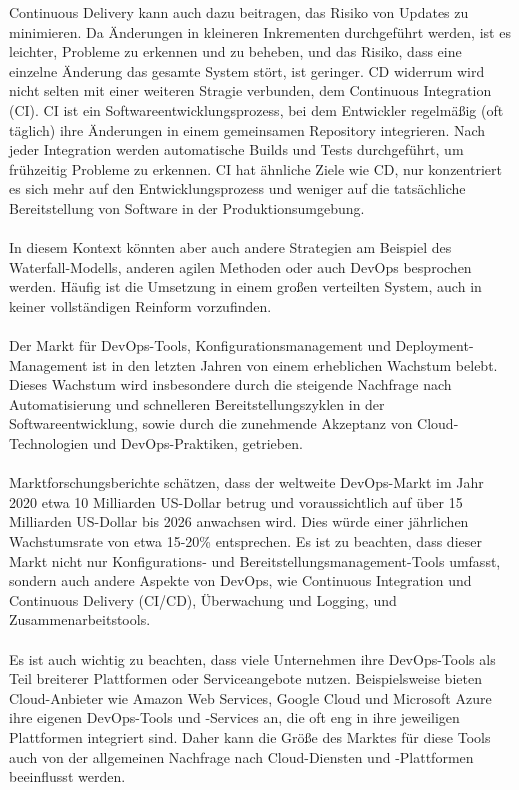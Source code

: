 Continuous Delivery kann auch dazu beitragen, das Risiko von Updates zu minimieren. Da Änderungen in kleineren Inkrementen durchgeführt werden, ist es leichter, Probleme zu erkennen und zu beheben, und das Risiko, dass eine einzelne Änderung das gesamte System stört, ist geringer. CD widerrum wird nicht selten mit einer weiteren Stragie verbunden, dem Continuous Integration (CI). CI ist ein Softwareentwicklungsprozess, bei dem Entwickler regelmäßig (oft täglich) ihre Änderungen in einem gemeinsamen Repository integrieren. Nach jeder Integration werden automatische Builds und Tests durchgeführt, um frühzeitig Probleme zu erkennen. CI hat ähnliche Ziele wie CD, nur konzentriert es sich mehr auf den Entwicklungsprozess und weniger auf die tatsächliche Bereitstellung von Software in der Produktionsumgebung. 
\\\\ 
In diesem Kontext könnten aber auch andere Strategien am Beispiel des Waterfall-Modells, anderen agilen Methoden oder auch DevOps besprochen werden. Häufig ist die Umsetzung in einem großen verteilten System, auch in keiner vollständigen Reinform vorzufinden.
\\\\
Der Markt für DevOps-Tools, Konfigurationsmanagement und Deployment-Management ist in den letzten Jahren von einem erheblichen Wachstum belebt. Dieses Wachstum wird insbesondere durch die steigende Nachfrage nach Automatisierung und schnelleren Bereitstellungszyklen in der Softwareentwicklung, sowie durch die zunehmende Akzeptanz von Cloud-Technologien und DevOps-Praktiken, getrieben.
\\\\
Marktforschungsberichte schätzen, dass der weltweite DevOps-Markt im Jahr 2020 etwa 10 Milliarden US-Dollar betrug und voraussichtlich auf über 15 Milliarden US-Dollar bis 2026 anwachsen wird. Dies würde einer jährlichen Wachstumsrate von etwa 15-20\% entsprechen. Es ist zu beachten, dass dieser Markt nicht nur Konfigurations- und Bereitstellungsmanagement-Tools umfasst, sondern auch andere Aspekte von DevOps, wie Continuous Integration und Continuous Delivery (CI/CD), Überwachung und Logging, und Zusammenarbeitstools.
\\\\
Es ist auch wichtig zu beachten, dass viele Unternehmen ihre DevOps-Tools als Teil breiterer Plattformen oder Serviceangebote nutzen. Beispielsweise bieten Cloud-Anbieter wie Amazon Web Services, Google Cloud und Microsoft Azure ihre eigenen DevOps-Tools und -Services an, die oft eng in ihre jeweiligen Plattformen integriert sind. Daher kann die Größe des Marktes für diese Tools auch von der allgemeinen Nachfrage nach Cloud-Diensten und -Plattformen beeinflusst werden.
